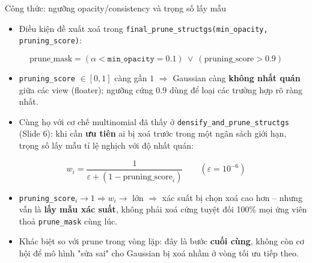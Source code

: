 \begin{frame}{Công thức: ngưỡng opacity/consistency và trọng số lấy mẫu}
\footnotesize
\begin{itemize}
    \item Điều kiện đề xuất xoá trong \texttt{final\_prune\_structgs(min\_opacity, pruning\_score)}:
\end{itemize}
\[
\text{prune\_mask} = (\alpha < \texttt{min\_opacity}{=}0.1) \ \vee\ (\text{pruning\_score} > 0.9)
\]
\begin{itemize}
    \item \texttt{pruning\_score} $\in [0,1]$ càng gần $1$ $\Rightarrow$ Gaussian càng \textbf{không nhất quán} giữa các view (floater); ngưỡng cứng $0.9$ dùng để loại các trường hợp rõ ràng nhất.
    \item Cùng họ với cơ chế multinomial đã thấy ở \texttt{densify\_and\_prune\_structgs} (Slide 6): khi cần \textbf{ưu tiên} ai bị xoá trước trong một ngân sách giới hạn, trọng số lấy mẫu tỉ lệ nghịch với độ nhất quán:
\end{itemize}
\[
w_i = \frac{1}{\varepsilon + (1-\text{pruning\_score}_i)} \qquad (\varepsilon{=}10^{-6})
\]
\begin{itemize}
    \item \texttt{pruning\_score}$_i \to 1 \Rightarrow w_i \to$ lớn $\Rightarrow$ xác suất bị chọn xoá cao hơn -- nhưng vẫn là \textbf{lấy mẫu xác suất}, không phải xoá cứng tuyệt đối 100\% mọi ứng viên thoả \texttt{prune\_mask} cùng lúc.
    \item Khác biệt so với prune trong vòng lặp: đây là bước \textbf{cuối cùng}, không còn cơ hội để mô hình "sửa sai" cho Gaussian bị xoá nhầm ở vòng tối ưu tiếp theo.
\end{itemize}
\end{frame}

